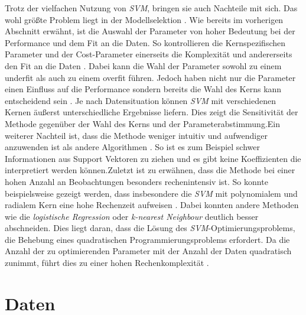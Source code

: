 \documentclass[
]{article}
\begin{document}
Trotz der vielfachen Nutzung von \textit{SVM}, bringen sie auch
Nachteile mit sich. Das wohl größte Problem liegt in der Modellselektion
\parencite{bennettSupportVectorMachines2000}. Wie bereits im vorherigen
Abschnitt erwähnt, ist die Auswahl der Parameter von hoher Bedeutung bei
der Performance und dem Fit an die Daten. So kontrollieren die
Kernspezifischen Parameter und der Cost-Parameter einerseits die
Komplexität und andererseits den Fit an die Daten
\parencite{kuhnAppliedPredictiveModeling2013}. Dabei kann die Wahl der
Parameter sowohl zu einem underfit als auch zu einem overfit führen.
Jedoch haben nicht nur die Parameter einen Einfluss auf die Performance
sondern bereits die Wahl des Kerns kann entscheidend sein
\parencite{burgesTutorialSupportVector1998}. Je nach Datensituation
können \textit{SVM} mit verschiedenen Kernen äußerst unterschiedliche
Ergebnisse liefern. Dies zeigt die Sensitivität der Methode gegenüber
der Wahl des Kerns und der Parameterabstimmung.\newline Ein weiterer
Nachteil ist, dass die Methode weniger intuitiv und aufwendiger
anzuwenden ist als andere Algorithmen
\parencite{bennettSupportVectorMachines2000}. So ist es zum Beispiel
schwer Informationen aus Support Vektoren zu ziehen und es gibt keine
Koeffizienten die interpretiert werden können.\newline Zuletzt ist zu
erwähnen, dass die Methode bei einer hohen Anzahl an Beobachtungen
besonders rechenintensiv ist. So konnte beispielsweise gezeigt werden,
dass insbesondere die \textit{SVM} mit polynomialem und radialem Kern
eine hohe Rechenzeit aufweisen
\parencite{scholzComparisonClassificationMethods2021}. Dabei konnten
andere Methoden wie die \textit{logistische Regression} oder
\textit{k-nearest Neighbour} deutlich besser abschneiden. Dies liegt
daran, dass die Lösung des \textit{SVM}-Optimierungsproblems, die
Behebung eines quadratischen Programmierungsproblems erfordert. Da die
Anzahl der zu optimierenden Parameter mit der Anzahl der Daten
quadratisch zunimmt, führt dies zu einer hohen Rechenkomplexität
\parencite{kecmanSupportVectorMachines2005}.

\section{Daten}
\end{document}
